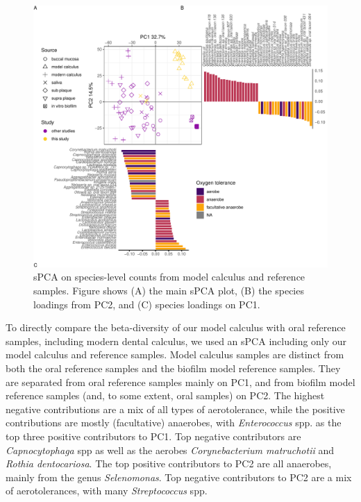 \documentclass[
]{article}
\begin{document}
\begin{figure}

{\centering \includegraphics{index_files/figure-pdf/fig-spca-compar-1.pdf}

}

\caption{\label{fig-spca-compar}sPCA on species-level counts from model
calculus and reference samples. Figure shows (A) the main sPCA plot, (B)
the species loadings from PC2, and (C) species loadings on PC1.}

\end{figure}

To directly compare the beta-diversity of our model calculus with oral
reference samples, including modern dental calculus, we used an sPCA
including only our model calculus and reference samples. Model calculus
samples are distinct from both the oral reference samples and the
biofilm model reference samples. They are separated from oral reference
samples mainly on PC1, and from biofilm model reference samples (and, to
some extent, oral samples) on PC2. The highest negative contributions
are a mix of all types of aerotolerance, while the positive
contributions are mostly (facultative) anaerobes, with
\emph{Enterococcus} spp. as the top three positive contributors to PC1.
Top negative contributors are \emph{Capnocytophaga} spp as well as the
aerobes \emph{Corynebacterium matruchotii} and \emph{Rothia
dentocariosa}. The top positive contributors to PC2 are all anaerobes,
mainly from the genus \emph{Selenomonas}. Top negative contributors to
PC2 are a mix of aerotolerances, with many \emph{Streptococcus} spp.
\end{document}
